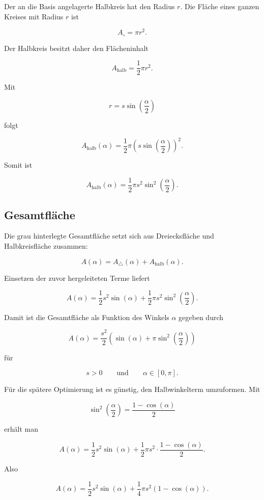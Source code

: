Der an die Basis angelagerte Halbkreis hat den Radius \(r\). Die Fläche
eines ganzen Kreises mit Radius \(r\) ist

\[
A_\circ
=
\pi r^2.
\]

Der Halbkreis besitzt daher den Flächeninhalt

\[
A_\text{halb}
=
\frac{1}{2}\pi r^2.
\]

Mit

\[
r
=
s\sin\left(\frac{\alpha}{2}\right)
\]

folgt

\[
A_\text{halb}(\alpha)
=
\frac{1}{2}\pi
\left(
s\sin\left(\frac{\alpha}{2}\right)
\right)^2.
\]

Somit ist

\[
A_\text{halb}(\alpha)
=
\frac{1}{2}\pi s^2
\sin^2\left(\frac{\alpha}{2}\right).
\]

\subsection{Gesamtfläche}

Die grau hinterlegte Gesamtfläche setzt sich aus Dreiecksfläche und
Halbkreisfläche zusammen:

\[
A(\alpha)
=
A_\triangle(\alpha)
+
A_\text{halb}(\alpha).
\]

Einsetzen der zuvor hergeleiteten Terme liefert

\[
A(\alpha)
=
\frac{1}{2}s^2\sin(\alpha)
+
\frac{1}{2}\pi s^2
\sin^2\left(\frac{\alpha}{2}\right).
\]

Damit ist die Gesamtfläche als Funktion des Winkels \(\alpha\) gegeben
durch

\[
\boxed{
A(\alpha)
=
\frac{s^2}{2}
\left(
\sin(\alpha)
+
\pi
\sin^2\left(\frac{\alpha}{2}\right)
\right)
}
\]

für

\[
s>0
\qquad \text{und} \qquad
\alpha\in[0,\pi].
\]

Für die spätere Optimierung ist es günstig, den Halbwinkelterm
umzuformen. Mit

\[
\sin^2\left(\frac{\alpha}{2}\right)
=
\frac{1-\cos(\alpha)}{2}
\]

erhält man

\[
A(\alpha)
=
\frac{1}{2}s^2\sin(\alpha)
+
\frac{1}{2}\pi s^2
\cdot
\frac{1-\cos(\alpha)}{2}.
\]

Also

\[
A(\alpha)
=
\frac{1}{2}s^2\sin(\alpha)
+
\frac{1}{4}\pi s^2
\left(
1-\cos(\alpha)
\right).
\]

